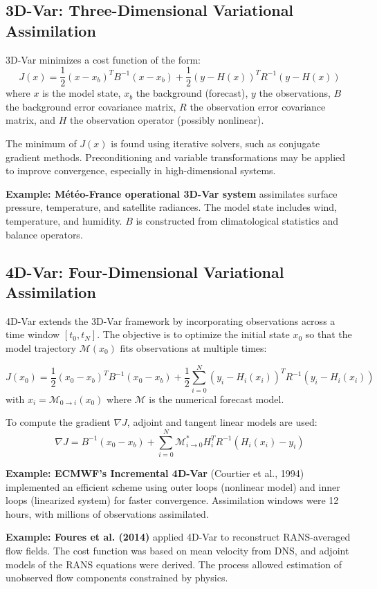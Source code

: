 \documentclass[a4paper]{article}
\begin{document}
\subsection{3D-Var: Three-Dimensional Variational Assimilation}

3D-Var minimizes a cost function of the form:
\[
J(x) = \frac{1}{2}(x - x_b)^T B^{-1}(x - x_b) + \frac{1}{2}(y - H(x))^T R^{-1}(y - H(x))
\]
where $x$ is the model state, $x_b$ the background (forecast), $y$ the observations, $B$ the background error covariance matrix, $R$ the observation error covariance matrix, and $H$ the observation operator (possibly nonlinear).

The minimum of $J(x)$ is found using iterative solvers, such as conjugate gradient methods. Preconditioning and variable transformations may be applied to improve convergence, especially in high-dimensional systems.

\textbf{Example: Météo-France operational 3D-Var system} assimilates surface pressure, temperature, and satellite radiances. The model state includes wind, temperature, and humidity. $B$ is constructed from climatological statistics and balance operators.

\subsection{4D-Var: Four-Dimensional Variational Assimilation}

4D-Var extends the 3D-Var framework by incorporating observations across a time window $[t_0, t_N]$. The objective is to optimize the initial state $x_0$ so that the model trajectory $\mathcal{M}(x_0)$ fits observations at multiple times:

\[
J(x_0) = \frac{1}{2}(x_0 - x_b)^T B^{-1}(x_0 - x_b) + \frac{1}{2} \sum_{i=0}^{N} (y_i - H_i(x_i))^T R^{-1} (y_i - H_i(x_i))
\]
with $x_i = \mathcal{M}_{0 \rightarrow i}(x_0)$ where $\mathcal{M}$ is the numerical forecast model.

To compute the gradient $\nabla J$, adjoint and tangent linear models are used:
\[
\nabla J = B^{-1}(x_0 - x_b) + \sum_{i=0}^N \mathcal{M}^*_{i \rightarrow 0} H_i^T R^{-1} (H_i(x_i) - y_i)
\]

\textbf{Example: ECMWF’s Incremental 4D-Var} (Courtier et al., 1994) implemented an efficient scheme using outer loops (nonlinear model) and inner loops (linearized system) for faster convergence. Assimilation windows were 12 hours, with millions of observations assimilated.

\textbf{Example: Foures et al. (2014)} applied 4D-Var to reconstruct RANS-averaged flow fields. The cost function was based on mean velocity from DNS, and adjoint models of the RANS equations were derived. The process allowed estimation of unobserved flow components constrained by physics.
\end{document}
